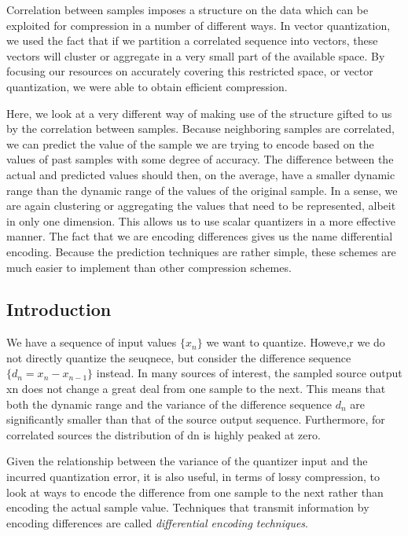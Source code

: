 
Correlation between samples imposes a structure on the data which can be exploited for compression in a number of different ways. In vector quantization, we used the fact that if we partition a correlated sequence into vectors, these vectors will cluster or aggregate in a very small part of the available space. By focusing our resources on accurately covering this restricted space, or vector quantization, we were able to obtain efficient compression.

Here, we look at a very different way of making use of the structure gifted to us by the correlation between samples. Because neighboring samples are correlated, we can predict the value of the sample we are trying to encode based on the values of past samples with some degree of accuracy. The difference between the actual and predicted values should then, on the average, have a smaller dynamic range than the dynamic range of the values of the original sample. In a sense, we are again clustering or aggregating the values that need to be represented, albeit in only one dimension. This allows us to use scalar quantizers in a more effective manner. The fact that we are encoding differences gives us the name differential encoding. Because the prediction techniques are rather simple, these schemes are much easier to implement than other compression schemes.

\subsection{Introduction}

We have a sequence of input values $\{x_n\}$ we want to quantize. Howeve,r we do not directly quantize the seuqnece, but consider the difference sequence $\{ d_n = x_n - x_{n-1} \}$ instead. In many sources of interest, the sampled source output {xn } does not change a great deal from one sample to the next. This means that both the dynamic range and the variance of the difference sequence $d_n$ are significantly smaller than that of the source output sequence. Furthermore, for correlated sources the distribution of dn is highly peaked at zero.

Given the relationship between the variance of the quantizer input and the incurred quantization error, it is also useful, in terms of lossy compression, to look at ways to encode the difference from one sample to the next rather than encoding the actual sample value. Techniques that transmit information by encoding differences are called \emph{differential encoding techniques}.

